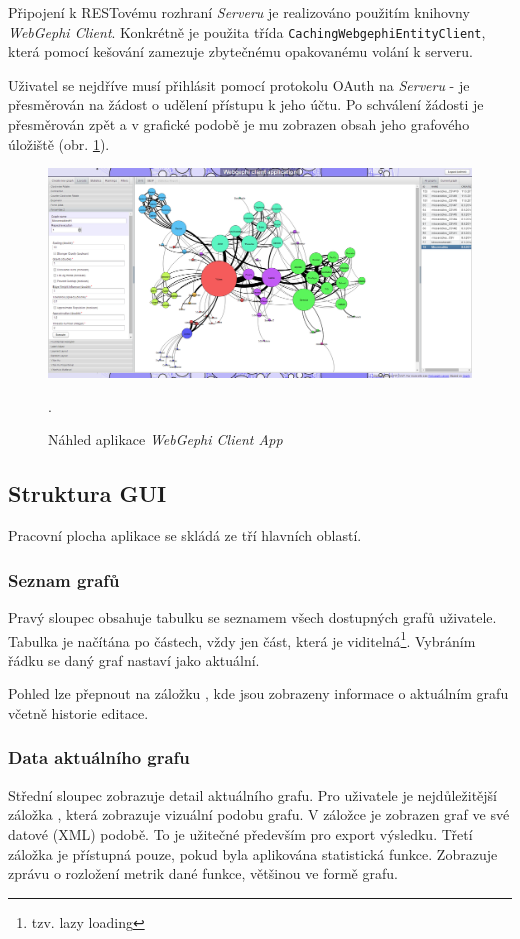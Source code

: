 \documentclass[thesis=M,czech]{FITthesis}[2014/05/6]
\begin{document}
Připojení k RESTovému rozhraní \textit{Serveru} je realizováno použitím knihovny \textit{WebGephi Client}. Konkrétně je použita třída \texttt{Caching\-Webgephi\-Entity\-Client}, která 
pomocí kešování zamezuje zbytečnému opakovanému volání k serveru.

Uživatel se nejdříve musí přihlásit pomocí protokolu OAuth na \textit{Serveru} - je přesměrován na žádost o udělení přístupu k jeho účtu. Po schválení žádosti je
přesměrován zpět a v grafické podobě je mu zobrazen obsah jeho grafového úložiště (obr. \ref{fig:clientapp-overview}). 

\begin{figure}\centering
 	\includegraphics[width=1\textwidth]{images/prtsc/clientapp-overview}
 	\caption[Náhled aplikace \textit{WebGephi Client App}]{Náhled aplikace \textit{WebGephi Client App}}.\label{fig:clientapp-overview}
\end{figure}

\subsection{Struktura GUI}
Pracovní plocha aplikace se skládá ze tří hlavních oblastí.

\subsubsection{Seznam grafů}
Pravý sloupec obsahuje tabulku se seznamem všech dostupných grafů uživatele. Tabulka je načítána po částech, vždy jen část, která je viditelná\footnote{tzv. lazy loading}. Vybráním řádku se daný graf nastaví jako aktuální. 

Pohled lze přepnout na záložku , kde jsou zobrazeny informace o aktuálním grafu včetně historie editace.

\subsubsection{Data aktuálního grafu}
Střední sloupec zobrazuje detail aktuálního grafu. Pro uživatele je nejdůležitější záložka , která zobrazuje vizuální podobu grafu. V záložce  je zobrazen 
graf ve své datové (XML) podobě. To je užitečné především pro export výsledku. Třetí záložka je přístupná pouze, pokud byla aplikována statistická funkce. Zobrazuje zprávu o rozložení 
metrik dané funkce, většinou ve formě grafu.
\end{document}
